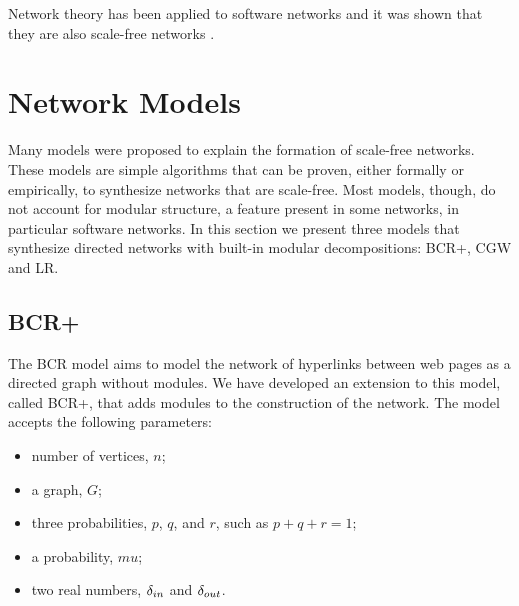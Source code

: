 Network theory has been applied to software networks and it was shown that they
are also scale-free networks \cite{Myers2003,Valverde2003}.

%

\section{Network Models}

Many models were proposed to explain the formation of scale-free networks. These
models are simple algorithms that can be proven, either formally or empirically,
to synthesize networks that are scale-free. Most models, though, do not account
for modular structure, a feature present in some networks, in particular
software networks. In this section we present three models that synthesize
directed networks with built-in modular decompositions: BCR+, CGW and LR. 




\subsection{BCR+}

The BCR model \cite{Bollobas2003} aims to model the network of hyperlinks
between web pages as a directed graph without modules. We have developed an
extension to this model, called BCR+, that adds modules to the construction of
the network. The model accepts the following parameters:

\begin{itemize}
\item number of vertices, $n$;
\item a graph, $G$;
\item three probabilities, $p$, $q$, and $r$, such as $p + q + r = 1$;
\item a probability, $mu$;
\item two real numbers, $\delta_{in}$ and $\delta_{out}$.
\end{itemize}

